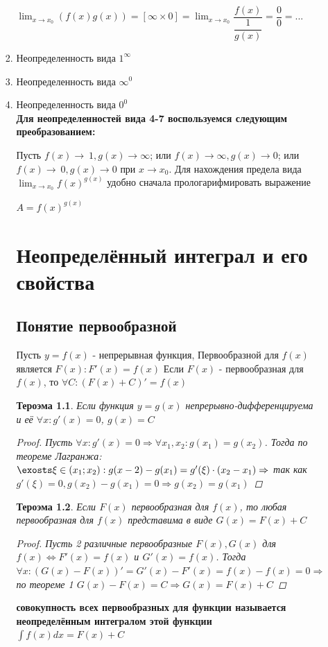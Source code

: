 \documentclass[oneside]{book}
\newtheorem{thm}{Тероэма}[chapter] %
\begin{document}
\begin{enumerate}
\begin{itemize}
\begin{enumerate}
	$\lim_{x \to x_{0}} (f(x)g(x))=
	[\infty\times 0]=
	\lim_{x \to x_{0}} \dfrac{f(x)}{\dfrac{1}{g(x)}}=
	\dfrac{0}{0}=...$

	\item Неопределенность вида $1^{\infty}$
	\item Неопределенность вида $\infty^{0}$
	\item Неопределенность вида $0^{0}$\\

	\textbf{Для неопределенностей вида 4-7 воспользуемся следующим преобразованием:}

	Пусть $f(x)\to\ 1, g(x)\to\infty$; или $f(x)\to\infty, g(x)\to 0$; или $f(x)\to\ 0, g(x)\to 0$ при $x\to x_{0}$. Для нахождения предела вида $\lim_{x\to x_{0}} f(x)^{g(x)}$ удобно сначала прологарифмировать выражение
	 \begin{center}
		$A=f(x)^{g(x)}$
	\end{center}



\setcounter{chapter}{31}
\chapter[Неопределённый интеграл]{Неопределённый интеграл и его свойства\\}
\section[Первообразная]{Понятие первообразной}
Пусть $y = f(x)$ - непрерывная функция, Первообразной для $f(x)$ является $F(x): F'(x) = f(x)$
Если $F(x)$ - первообразная для $f(x)$, то $\forall C: (F(x) + C)' = f(x)$
\begin{thm}
  Если функция $y = g(x)$ непрерывно-дифференцируема и её $\forall x: g'(x) = 0$, $g(x) = C$
  \begin{proof}
    Пусть $\forall x: g'(x) = 0 \Rightarrow \forall x_1, x_2: g(x_1) = g(x_2)$. Тогда по теореме Лагранжа:
    $\exosts \xi \in (x_1; x_2): g(x-2) - g(x_1) = g'(\xi)\cdot(x_2 - x_1) \Rightarrow$ так как $g'(\xi) = 0, g(x_2) - g(x_1) = 0 \Rightarrow g(x_2) = g(x_1)$
  \end{proof}
\end{thm}
\begin{thm}
  Если $F(x)$ первообразная для $f(x)$, то любая первообразная для $f(x)$ представима в виде $G(x) = F(x) + C$
  \begin{proof}
    Пусть 2 различные первообразные $F(x), G(x)$ для $f(x) \Leftrightarrow F'(x) = f(x) $ и $G'(x) = f(x)$.
    Тогда $\forall x: (G(x) - F(x))' = G'(x) - F'(x) = f(x) - f(x) = 0 \Rightarrow$ по теореме 1 $G(x) - F(x) = C \Rightarrow G(x) = F(x) + C$
  \end{proof}
\end{thm}
\textbf{совокупность всех первообразных для функции называется неопределённым интегралом этой функции $\int f(x) dx = F(x) + C$}

\end{enumerate}
\end{itemize}
\end{enumerate}
\end{document}
